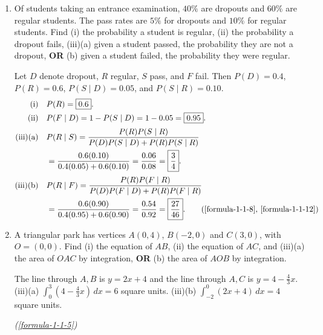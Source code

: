 \begin{enumerate}[label={},font=\normalfont,leftmargin=1.15cm,labelwidth=1.0cm,labelsep=0.15cm,itemindent=0pt,listparindent=0pt,itemsep=\baselineskip,parsep=0pt,topsep=0pt]
\newpage
\item[3.1.37] Of students taking an entrance examination, $40\%$ are dropouts and $60\%$ are regular students. The pass rates are $5\%$ for dropouts and $10\%$ for regular students. Find (i) the probability a student is regular, (ii) the probability a dropout fails, (iii)(a) given a student passed, the probability they are not a dropout, \textbf{OR} (b) given a student failed, the probability they were regular.

\vspace{0.6em}\par\solution


Let $D$ denote dropout, $R$ regular, $S$ pass, and $F$ fail. Then $P(D)=0.4$, $P(R)=0.6$, $P(S\mid D)=0.05$, and $P(S\mid R)=0.10$.
\begin{align*}
\text{(i)}\quad&P(R)=\boxed{0.6}.\\
\text{(ii)}\quad&P(F\mid D)=1-P(S\mid D)=1-0.05=\boxed{0.95}.\\[2pt]
\text{(iii)(a)}\quad&P(R\mid S)=\frac{P(R)P(S\mid R)}{P(D)P(S\mid D)+P(R)P(S\mid R)}\\
&=\frac{0.6(0.10)}{0.4(0.05)+0.6(0.10)}=\frac{0.06}{0.08}=\boxed{\frac34}.\\[2pt]
\text{(iii)(b)}\quad&P(R\mid F)=\frac{P(R)P(F\mid R)}{P(D)P(F\mid D)+P(R)P(F\mid R)}\\
&=\frac{0.6(0.90)}{0.4(0.95)+0.6(0.90)}=\frac{0.54}{0.92}=\boxed{\frac{27}{46}}.\tag*{(\ref{formula-1-1-8}, \ref{formula-1-1-12})}\end{align*}

\item[3.1.38] A triangular park has vertices $A(0,4)$, $B(-2,0)$ and $C(3,0)$, with $O=(0,0)$. Find (i) the equation of $AB$, (ii) the equation of $AC$, and (iii)(a) the area of $OAC$ by integration, \textbf{OR} (b) the area of $AOB$ by integration.

\vspace{0.6em}\par\solution


The line through $A,B$ is $\boxed{y=2x+4}$ and the line through $A,C$ is $\boxed{y=4-\frac43x}$. (iii)(a) $\int_0^3(4-\frac43x)\,dx=\boxed{6}$ square units. (iii)(b) $\int_{-2}^0(2x+4)\,dx=\boxed{4}$ square units.
\par\noindent\hfill\mbox{\textit{(\ref{formula-1-1-5})}}\par\end{enumerate}
